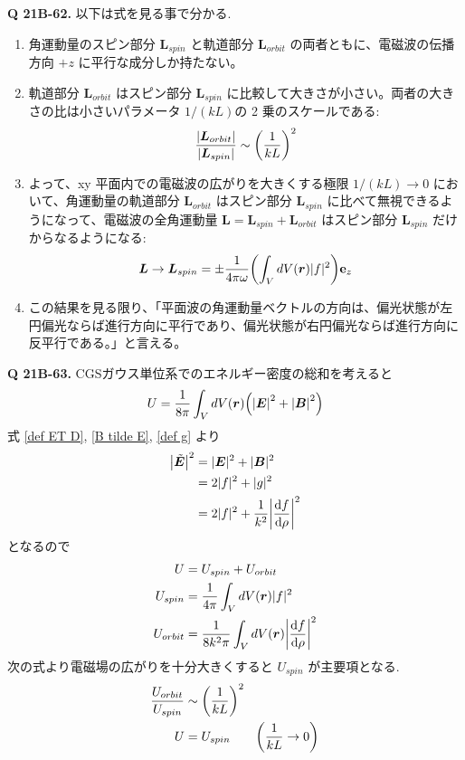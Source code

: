 \documentclass[uplatex,dvipdfmx,a4paper,11pt]{jlreq}
\newcommand{\EE}{\bm{E}}
\newcommand{\BB}{\bm{B}}
\newcommand{\rr}{\bm{r}}
\newcommand{\ET}{\tilde{\bm{E}}}
\newcommand{\LL}{\bm{L}}
\theoremstyle{definition}
\begin{document}
\textbf{Q 21B-62.}
以下は式を見る事で分かる.
\begin{enumerate}
  \item 角運動量のスピン部分 $\LL_{spin}$ と軌道部分 $\LL_{orbit}$ の両者ともに、電磁波の伝播方向 $+z$ に平行な成分しか持たない。
  \item 軌道部分 $\LL_{orbit}$ はスピン部分 $\LL_{spin}$ に比較して大きさが小さい。両者の大きさの比は小さいパラメータ $1/(kL)$の 2 乗のスケールである:
        \begin{align}
          \frac{|\LL_{orbit}|}{|\LL_{spin}|} \sim \qty(\frac{1}{kL})^2
        \end{align}
  \item よって、xy 平面内での電磁波の広がりを大きくする極限 $1/(kL) \to 0$ において、角運動量の軌道部分 $\LL_{orbit}$ はスピン部分 $\LL_{spin}$ に比べて無視できるようになって、電磁波の全角運動量 $\LL = \LL_{spin} + \LL_{orbit}$ はスピン部分 $\LL_{spin}$ だけからなるようになる:
        \begin{align}
          \LL \to \LL_{spin} = \pm \frac{1}{4\pi\omega}\qty(\int_VdV(\rr)|f|^2)\vb{e}_z \label{L limit}
        \end{align}
  \item この結果を見る限り、「平面波の角運動量ベクトルの方向は、偏光状態が左円偏光ならば進行方向に平行であり、偏光状態が右円偏光ならば進行方向に反平行である。」と言える。
\end{enumerate}

\textbf{Q 21B-63.}
CGSガウス単位系でのエネルギー密度の総和を考えると
\begin{align}
  U = \frac{1}{8\pi}\int_VdV(\rr)\qty(\qty|\EE|^2 + \qty|\BB|^2)
\end{align}
式 \eqref{def ET D}, \eqref{B tilde E}, \eqref{def g} より
\begin{align}
  \qty|\ET|^2 & = |\EE|^2 + |\BB|^2                          \\
              & = 2|f|^2 + |g|^2                             \\
              & = 2|f|^2 + \frac{1}{k^2}\qty|\dv{f}{\rho}|^2
\end{align}
となるので
\begin{align}
  U         & = U_{spin} + U_{orbit}                               \\
  U_{spin}  & = \frac{1}{4\pi}\int_VdV(\rr)|f|^2                   \\
  U_{orbit} & = \frac{1}{8k^2\pi}\int_VdV(\rr)\qty|\dv{f}{\rho}|^2 \\
\end{align}
次の式より電磁場の広がりを十分大きくすると $U_{spin}$ が主要項となる.
\begin{align}
  \frac{U_{orbit}}{U_{spin}} & \sim \qty(\frac{1}{kL})^2                                                \\
  U                          & = U_{spin}                \qquad \qty(\frac{1}{kL}\to 0) \label{U limit}
\end{align}
\end{document}
